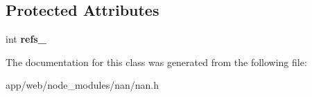 \subsection*{Protected Attributes}
\begin{DoxyCompactItemize}
\item 
\mbox{\label{class_nan_1_1_object_wrap_ab885ac1960f7b8cbb71180ae9fd0b654}} 
int {\bfseries refs\+\_\+}
\end{DoxyCompactItemize}


The documentation for this class was generated from the following file\+:\begin{DoxyCompactItemize}
\item 
app/web/node\+\_\+modules/nan/nan.\+h\end{DoxyCompactItemize}
